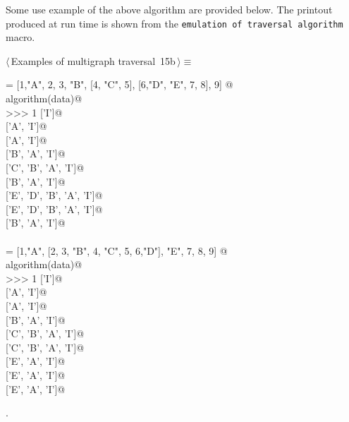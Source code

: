 \documentclass[11pt,oneside]{article}	%
\begin{document}
Some use example of the above algorithm are provided below. The printout produced at run time is shown from the \texttt{emulation of traversal algorithm} macro.
\begin{flushleft} \small \label{scrap29}
\protect{}$\langle\,$Examples of multigraph traversal\nobreak\ {\footnotesize 15b}$\,\rangle\equiv$
\vspace{-1ex}
\begin{list}{}{} \item
\mbox{}\verb@data = [1,"A", 2, 3, "B", [4, "C", 5], [6,"D", "E", 7, 8], 9]  @\\
\mbox{}\verb@print algorithm(data)@\\
\mbox{}\verb@>>> 1 ['I']@\\
\mbox{} ['A', 'I']@\\
\mbox{} ['A', 'I']@\\
\mbox{} ['B', 'A', 'I']@\\
\mbox{} ['C', 'B', 'A', 'I']@\\
\mbox{} ['B', 'A', 'I']@\\
\mbox{} ['E', 'D', 'B', 'A', 'I']@\\
\mbox{} ['E', 'D', 'B', 'A', 'I']@\\
\mbox{} ['B', 'A', 'I']@\\
\mbox{}\verb@@\\
\mbox{}\verb@data = [1,"A", [2, 3, "B", 4, "C", 5, 6,"D"], "E", 7, 8, 9]  @\\
\mbox{}\verb@print algorithm(data)@\\
\mbox{}\verb@>>> 1 ['I']@\\
\mbox{} ['A', 'I']@\\
\mbox{} ['A', 'I']@\\
\mbox{} ['B', 'A', 'I']@\\
\mbox{} ['C', 'B', 'A', 'I']@\\
\mbox{} ['C', 'B', 'A', 'I']@\\
\mbox{} ['E', 'A', 'I']@\\
\mbox{} ['E', 'A', 'I']@\\
\mbox{} ['E', 'A', 'I']@\\
\mbox{}\verb@@{\NWsep}
\end{list}
\vspace{-1ex}
\footnotesize\addtolength{\baselineskip}{-1ex}
\begin{list}{}{\setlength{\itemsep}{-\parsep}\setlength{\itemindent}{-\leftmargin}}
\item {\NWtxtMacroNoRef}.
\end{list}
\end{flushleft}
\end{document}
